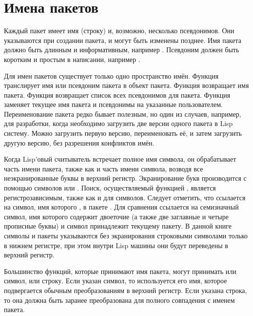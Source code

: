 \section{Имена пакетов}
\label{PACKAGE-NAMES-SECTION}

Каждый пакет имеет имя (строку) и, возможно, несколько
псевдонимов. Они указываются при создании пакета, и могут быть
изменены позднее. Имя пакета должно быть длинным и информативным,
например . Псевдоним должен быть коротким и простым в
написании, например .

Для имен пакетов существует только одно пространство имён. Функция
 транслирует имя или псевдоним пакета в объект
пакета. Функция  возвращает имя пакета. Функция
 возвращает список всех псевдонимов для
пакета. Функция  заменяет текущее имя пакета и
псевдонимы на указанные пользователем. Переименование пакета редко
бывает полезным, но один из случаев, например, для разработки, когда
необходимо загрузить две версии одного пакета в Lisp систему. Можно
загрузить первую версию, переименовать её, и затем загрузить другую
версию, без разрешения конфликтов имён.

Когда Lisp'овый считыватель встречает полное имя символа, он
обрабатывает часть имени пакета, также как и часть имени символа,
возводя все неэкранированные буквы в верхний регистр. Экранирование
букв производится с помощью символов \cd{{\Xbackslash}} или
\cd{|}. Поиск, осуществляемый функцией , является
регистрозависимым, также как и для символов. Следует отметить, что
 ссылается на символ, имя которого , в пакете
. Для сравнения  ссылается на семизначный
символ, имя которого содержит двоеточие (а также две заглавные и
четыре прописные буквы) и символ принадлежит текущему пакету. В данной
книге символы и пакеты указываются без экранирования строковыми
символами только в нижнем регистре, при этом внутри Lisp машины они
будут переведены в верхний регистр.

Большинство функций, которые принимают имя пакета, могут принимать или
символ, или строку. Если указан символ, то используется его имя,
которое подвергается обычным преобразованиям в верхний регистр. Если
указана строка, то она должна быть заранее преобразована для полного
совпадения с именем пакета.

